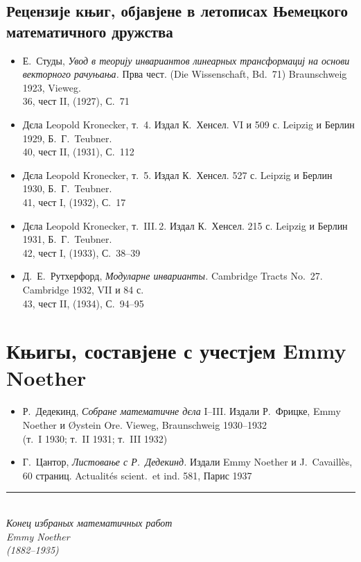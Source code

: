 \documentclass[11pt]{article}
\newcommand{\foreign}[1]{#1}
\begin{document}
\subsection*{Рецензије књиг, објавјене в летописах Њемецкого математичного дружства}

\begin{itemize}[leftmargin=1.5em,itemsep=0.2em]
\item Е.\ Студы, \textit{Увод в теорију инвариантов линеарных трансформациј на основи векторного рачуњања.} Прва чест. (\foreign{Die Wissenschaft}, Bd.~71) \foreign{Braunschweig} 1923, \foreign{Vieweg}.\\
36, чест II, (1927), С.~71

\item Дєла Leopold Kronecker, т.~4. Издал К.\ Хенсел. VI и 509 с. Leipzig и Берлин 1929, Б.\ Г.\ Teubner.\\
40, чест II, (1931), С.~112

\item Дєла Leopold Kronecker, т.~5. Издал К.\ Хенсел. 527 с. Leipzig и Берлин 1930, Б.\ Г.\ Teubner.\\
41, чест I, (1932), С.~17

\item Дєла Leopold Kronecker, т.~III.\,2. Издал К.\ Хенсел. 215 с. Leipzig и Берлин 1931, Б.\ Г.\ Teubner.\\
42, чест I, (1933), С.~38--39

\item Д.\ Е.\ Рутхерфорд, \textit{Модуларне инварианты.} \foreign{Cambridge Tracts No.~27.} Cambridge 1932, VII и 84 с.\\
43, чест II, (1934), С.~94--95
\end{itemize}

\newpage
\section*{Књигы, составјене с учестјем Emmy Noether}

\begin{itemize}[leftmargin=1.5em,itemsep=0.5em]
\item Р.\ Дедекинд, \textit{Собране математичне дєла} I--III. Издали Р.\ Фрицке, Emmy Noether и \foreign{Øystein Ore}. \foreign{Vieweg}, \foreign{Braunschweig} 1930--1932\\
(т.~I 1930; т.~II 1931; т.~III 1932)

\item Г.\ Цантор, \textit{Листовање с Р.\ Дедекинд.} Издали Emmy Noether и \foreign{J.\ Cavaillès}, 60 страниц. \foreign{Actualités scient.\ et ind.} 581, Парис 1937
\end{itemize}

\vfill

\begin{center}
\rule{0.5\textwidth}{0.4pt}\\[1em]
\textit{Конец избраных математичных работ}\\[0.5em]
\textit{Emmy Noether}\\[0.5em]
\textit{(1882--1935)}
\end{center}
\end{document}
